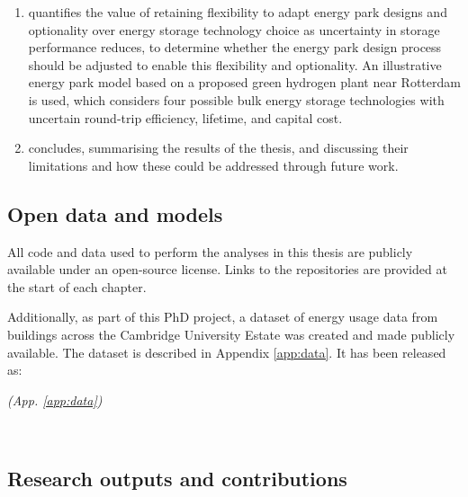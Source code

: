 \begin{enumerate}[wide, labelwidth=!, labelindent=0pt]
    \item[\it\Cref{chap:parks}] quantifies the value of retaining flexibility to adapt energy park designs and optionality over energy storage technology choice as uncertainty in storage performance reduces, to determine whether the energy park design process should be adjusted to enable this flexibility and optionality. An illustrative energy park model based on a proposed green hydrogen plant near Rotterdam is used, which considers four possible bulk energy storage technologies with uncertain round-trip efficiency, lifetime, and capital cost.

    \item[\it\Cref{chap:conclusion}] concludes, summarising the results of the thesis, and discussing their limitations and how these could be addressed through future work.

\end{enumerate}



\ifdefineSpeech
\else

\newpage
\subsection{Open data and models}

All code and data used to perform the analyses in this thesis are publicly available under an open-source license. Links to the repositories are provided at the start of each chapter.

Additionally, as part of this PhD project, a dataset of energy usage data from buildings across the Cambridge University Estate was created and made publicly available. The dataset is described in Appendix \ref{app:data}. It has been released as:

\begin{cbox}[colback=Cerulean!10!white]{}
    \setlength{\parindent}{0pt}%

     \textit{(App. \ref{app:data})}

\end{cbox}

\hfill \\

\subsection{Research outputs and contributions}

